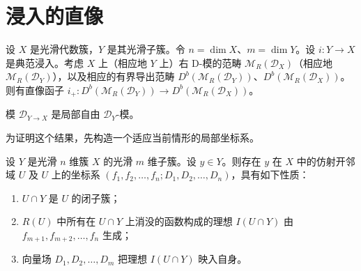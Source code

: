 \section{浸入的直像}

设 $X$ 是光滑代数簇，$Y$ 是其光滑子簇。令 $n=\dim X$、$m=\dim Y$。设 $i:Y\to X$ 是典范浸入。考虑 $X$ 上（相应地 $Y$ 上）右 D-模的范畴 $\mathcal{M}_R(\mathcal{D}_X)$（相应地 $\mathcal{M}_R(\mathcal{D}_Y)$），以及相应的有界导出范畴 $D^b(\mathcal{M}_R(\mathcal{D}_Y))$、$D^b(\mathcal{M}_R(\mathcal{D}_X))$。则有直像函子
$i_+:D^b(\mathcal{M}_R(\mathcal{D}_Y))\to D^b(\mathcal{M}_R(\mathcal{D}_X))$。

\begin{proposition}\label{prop:4.6.1}
模 $\mathcal{D}_{Y\to X}$ 是局部自由 $\mathcal{D}_Y$-模。
\end{proposition}

为证明这个结果，先构造一个适应当前情形的局部坐标系。

\begin{lemma}\label{lem:4.6.2}
设 $Y$ 是光滑 $n$ 维簇 $X$ 的光滑 $m$ 维子簇。设 $y\in Y$。则存在 $y$ 在 $X$ 中的仿射开邻域 $U$ 及 $U$ 上的坐标系
$(f_1,f_2,\dots,f_n;D_1,D_2,\dots,D_n)$，具有如下性质：
\begin{enumerate}[label=(\roman*)]
  \item $U\cap Y$ 是 $U$ 的闭子簇；
  \item $R(U)$ 中所有在 $U\cap Y$ 上消没的函数构成的理想 $I(U\cap Y)$ 由
    $f_{m+1},f_{m+2},\dots,f_n$ 生成；
  \item 向量场 $D_1,D_2,\dots,D_m$ 把理想 $I(U\cap Y)$ 映入自身。
\end{enumerate}
\end{lemma}


